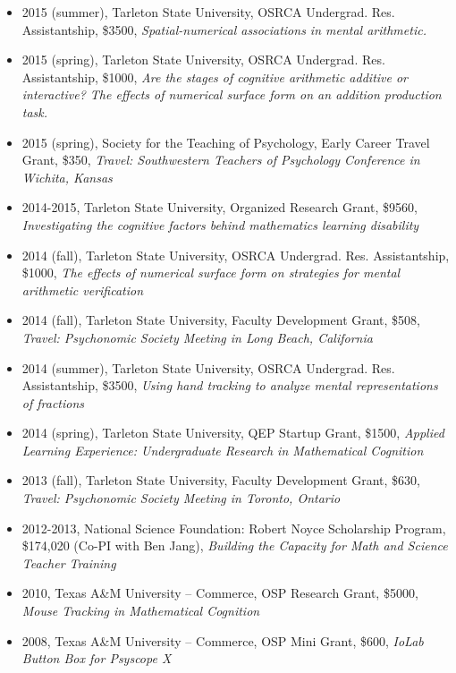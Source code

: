 \documentclass[article,10pt]{article}
\begin{document}
\begin{itemize}
\item 2015 (summer), Tarleton State University, OSRCA Undergrad. Res. Assistantship, \$3500, \emph{Spatial-numerical associations in mental arithmetic.}
\item 2015 (spring), Tarleton State University, OSRCA Undergrad. Res. Assistantship, \$1000, \emph{Are the stages of cognitive arithmetic additive or interactive? The effects of numerical surface form on an addition production task.}
\item 2015 (spring), Society for the Teaching of Psychology, Early Career Travel Grant, \$350, \emph{Travel: Southwestern Teachers of Psychology Conference in Wichita, Kansas}
\item 2014-2015, Tarleton State University, Organized Research Grant, \$9560, \emph{Investigating the cognitive factors behind mathematics learning disability}
\item 2014 (fall), Tarleton State University, OSRCA Undergrad. Res. Assistantship, \$1000, \emph{The effects of numerical surface form on strategies for mental arithmetic verification}
\item 2014 (fall), Tarleton State University, Faculty Development Grant, \$508, \emph{Travel: Psychonomic Society Meeting in Long Beach, California}
\item 2014 (summer), Tarleton State University, OSRCA Undergrad. Res. Assistantship, \$3500, \emph{Using hand tracking to analyze mental representations of fractions}
\item 2014 (spring), Tarleton State University, QEP Startup Grant, \$1500, \emph{Applied Learning Experience: Undergraduate Research in Mathematical Cognition}
\item 2013 (fall), Tarleton State University, Faculty Development Grant, \$630, \emph{Travel: Psychonomic Society Meeting in Toronto, Ontario}
\item 2012-2013, National Science Foundation: Robert Noyce Scholarship Program, \$174,020 (Co-PI with Ben Jang), \emph{Building the Capacity for Math and Science Teacher Training}
\item 2010, Texas A\&M University – Commerce, OSP Research Grant, \$5000, \emph{Mouse Tracking in Mathematical Cognition}
\item 2008, Texas A\&M University – Commerce, OSP Mini Grant, \$600, \emph{IoLab Button Box for Psyscope X}
\end{itemize}
\end{document}
